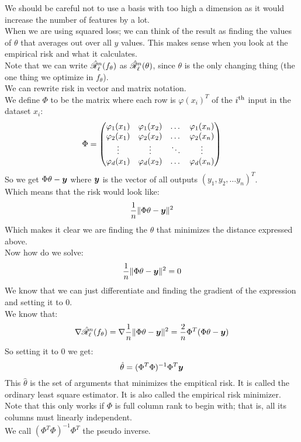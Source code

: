 \documentclass[12pt]{article}
\begin{document}
We should be careful not to use a basis with too
high a dimension as it would increase the number
of features by a lot. \\

When we are using squared loss; we can think
of the result as finding the values of $\theta$
that averages out over all $y$ values.
This makes sense when you look at the
empirical risk and what it calculates. \\

Note that we can write $\hat{\mathscr{R}}_{\ell}^{n}
(f_\theta)$ as $\hat{\mathscr{R}}_{\ell}^{n}
(\theta)$,
since $\theta$ is the only changing thing
(the one thing we optimize in $f_\theta$). \\

We can rewrite risk in vector and matrix
notation. \\
We define $\Phi$ to be the matrix
where each row is $\varphi(x_i)^T$
of the $i^{\text{th}}$ input in the dataset $x_i$:
\[ \Phi = \begin{pmatrix} 
\varphi_1(x_1) & \varphi_1(x_2) & \dots & \varphi_1(x_n) \\
\varphi_2(x_1) & \varphi_2(x_2) & \dots & \varphi_2(x_n) \\
\vdots & \vdots & \ddots & \vdots \\
\varphi_d(x_1) & \varphi_d(x_2) & \dots & \varphi_d(x_n) \end{pmatrix} \]
So we get $\Phi \theta - \boldsymbol{y}$
where $\boldsymbol{y}$ is the vector of all
outputs $(y_1, y_2, \dots y_n)^T$. \\
Which means that the risk would look like:
\[ \dfrac{1}{n}\|\Phi \theta - \boldsymbol{y}\|^2 \]
Which makes it clear we are finding the $\theta$
that minimizes the distance expressed above. \\

Now how do we solve:
\[ \dfrac{1}{n}\|\Phi \theta - \boldsymbol{y}\|^2 = 0 \]
We know that we can just differentiate and finding
the gradient of the expression and setting
it to $0$. \\
We know that:
\[ \nabla \hat{\mathscr{R}}_{\ell}^{n}(f_{\theta}) 
= \nabla \dfrac{1}{n}
\|\Phi \theta - \boldsymbol{y}\|^2 
= \dfrac{2}{n}\Phi^T(\Phi \theta - \boldsymbol{y}) \]
So setting it to $0$ we get:
\[ \hat{\theta} = (\Phi^T\Phi)^{-1} \Phi^T 
\boldsymbol{y} \]
This $\hat{\theta}$ is the set of arguments
that minimizes the empitical risk.
It is called the ordinary least square
estimator.
It is also called the empirical risk minimizer. \\
Note that this only works if $\Phi$
is full column rank to begin with;
that is, all its columns must linearly
independent. \\
We call $(\Phi^T\Phi)^{-1} \Phi^T$
the pseudo inverse. \\
\end{document}
